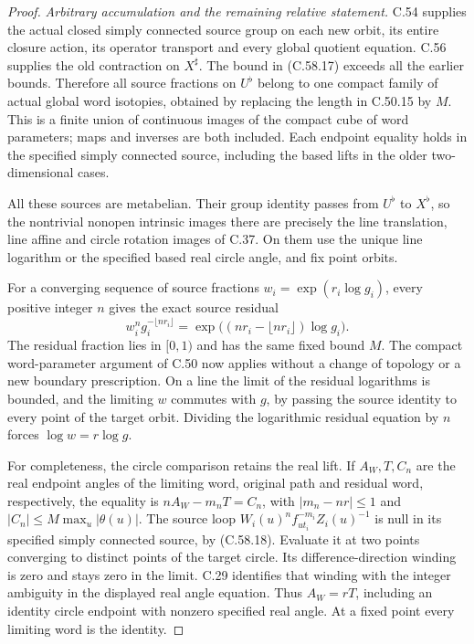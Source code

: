 \begin{proof}
\emph{Arbitrary accumulation and the remaining relative statement.}
C.54 supplies the actual closed simply connected source
group on each new orbit, its entire closure action, its
operator transport and every global quotient equation.
C.56 supplies the old contraction on $X^\sharp$.
The bound in (C.58.17) exceeds all the earlier bounds.
Therefore all source fractions on $U^\flat$ belong to
one compact family of actual global word isotopies,
obtained by replacing the length in C.50.15 by $M$.
This is a finite union of continuous images of the
compact cube of word parameters; maps and inverses
are both included. Each endpoint equality holds in
the specified simply connected source, including the
based lifts in the older two-dimensional cases.

All these sources are metabelian. Their group identity
passes from $U^\flat$ to $X^\flat$, so the nontrivial
nonopen intrinsic images there are precisely the line
translation, line affine and circle rotation images
of C.37. On them use the unique line logarithm or the
specified based real circle angle, and fix point orbits.

For a converging sequence of source fractions
$w_i=\exp(r_i\log g_i)$, every positive integer $n$
gives the exact source residual
\[
 w_i^n g_i^{-\lfloor nr_i\rfloor}
       =\exp\bigl((nr_i-\lfloor nr_i\rfloor)\log g_i\bigr).
                                                               \tag{C.58.18}
\]
The residual fraction lies in $[0,1)$ and has the
same fixed bound $M$.
The compact word-parameter argument of C.50 now applies
without a change of topology or a new boundary prescription.
On a line the limit of the residual logarithms is bounded,
and the limiting $w$ commutes with $g$, by passing the
source identity to every point of the target orbit.
Dividing the logarithmic residual equation by $n$
forces $\log w=r\log g$.

For completeness, the circle comparison retains the
real lift. If $A_W,T,C_n$ are the real endpoint angles
of the limiting word, original path and residual word,
respectively, the equality is
$nA_W-m_nT=C_n$, with $|m_n-nr|\leq1$ and
$|C_n|\leq M\max_u|\theta(u)|$.
The source loop
$W_i(u)^n f_{ut_i}^{-m_i}Z_i(u)^{-1}$
is null in its specified simply connected source,
by (C.58.18). Evaluate it at two points converging to
distinct points of the target circle.
Its difference-direction winding is zero and stays
zero in the limit. C.29 identifies that winding
with the integer ambiguity in the displayed real
angle equation. Thus $A_W=rT$, including an identity
circle endpoint with nonzero specified real angle.
At a fixed point every limiting word is the identity.


\end{proof}
